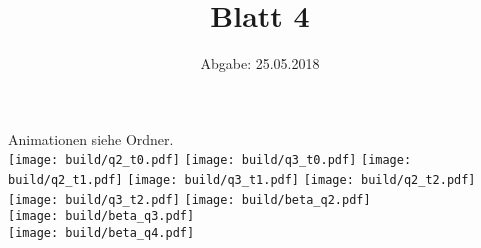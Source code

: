 

\title{Blatt 4}
\date{
  Abgabe: 25.05.2018
}



\parindent0mm
Animationen siehe Ordner.\\
\texttt{[image: build/q2\_t0.pdf]}
\texttt{[image: build/q3\_t0.pdf]}
\texttt{[image: build/q2\_t1.pdf]}
\texttt{[image: build/q3\_t1.pdf]}
\texttt{[image: build/q2\_t2.pdf]}
\texttt{[image: build/q3\_t2.pdf]}
\texttt{[image: build/beta\_q2.pdf]} \\
\texttt{[image: build/beta\_q3.pdf]} \\
\texttt{[image: build/beta\_q4.pdf]}



